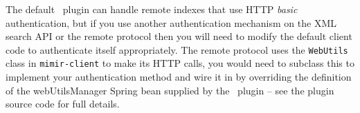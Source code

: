 The default \Mimir\ plugin can handle remote indexes that use HTTP {\em basic}
authentication, but if you use another authentication mechanism on the XML
search API or the remote protocol then you will need to modify the default
client code to authenticate itself appropriately.  The remote protocol uses the
{\tt WebUtils} class in {\tt mimir-client} to make its HTTP calls, you would
need to subclass this to implement your authentication method and wire it in by
overriding the definition of the webUtilsManager Spring bean supplied by the
\Mimir\ plugin -- see the plugin source code for full details.
